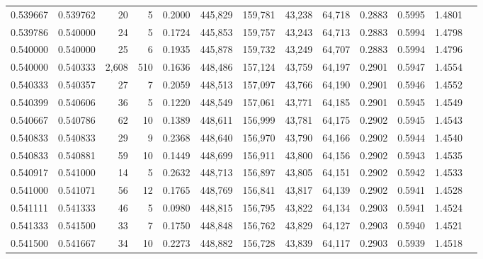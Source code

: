 \begin{tabular}{rrrrrrrrrrrrr}
0.539667 & 0.539762 &    20 &   5 &                                     0.2000 & 445,829 & 159,781 &  43,238 &  64,718 & 0.2883 & 0.5995 & 1.4801 \\
0.539786 & 0.540000 &    24 &   5 &                                     0.1724 & 445,853 & 159,757 &  43,243 &  64,713 & 0.2883 & 0.5994 & 1.4798 \\
0.540000 & 0.540000 &    25 &   6 &                                     0.1935 & 445,878 & 159,732 &  43,249 &  64,707 & 0.2883 & 0.5994 & 1.4796 \\
0.540000 & 0.540333 & 2,608 & 510 &                                     0.1636 & 448,486 & 157,124 &  43,759 &  64,197 & 0.2901 & 0.5947 & 1.4554 \\
0.540333 & 0.540357 &    27 &   7 &                                     0.2059 & 448,513 & 157,097 &  43,766 &  64,190 & 0.2901 & 0.5946 & 1.4552 \\
0.540399 & 0.540606 &    36 &   5 &                                     0.1220 & 448,549 & 157,061 &  43,771 &  64,185 & 0.2901 & 0.5945 & 1.4549 \\
0.540667 & 0.540786 &    62 &  10 &                                     0.1389 & 448,611 & 156,999 &  43,781 &  64,175 & 0.2902 & 0.5945 & 1.4543 \\
0.540833 & 0.540833 &    29 &   9 &                                     0.2368 & 448,640 & 156,970 &  43,790 &  64,166 & 0.2902 & 0.5944 & 1.4540 \\
0.540833 & 0.540881 &    59 &  10 &                                     0.1449 & 448,699 & 156,911 &  43,800 &  64,156 & 0.2902 & 0.5943 & 1.4535 \\
0.540917 & 0.541000 &    14 &   5 &                                     0.2632 & 448,713 & 156,897 &  43,805 &  64,151 & 0.2902 & 0.5942 & 1.4533 \\
0.541000 & 0.541071 &    56 &  12 &                                     0.1765 & 448,769 & 156,841 &  43,817 &  64,139 & 0.2902 & 0.5941 & 1.4528 \\
0.541111 & 0.541333 &    46 &   5 &                                     0.0980 & 448,815 & 156,795 &  43,822 &  64,134 & 0.2903 & 0.5941 & 1.4524 \\
0.541333 & 0.541500 &    33 &   7 &                                     0.1750 & 448,848 & 156,762 &  43,829 &  64,127 & 0.2903 & 0.5940 & 1.4521 \\
0.541500 & 0.541667 &    34 &  10 &                                     0.2273 & 448,882 & 156,728 &  43,839 &  64,117 & 0.2903 & 0.5939 & 1.4518 \\

\end{tabular}
